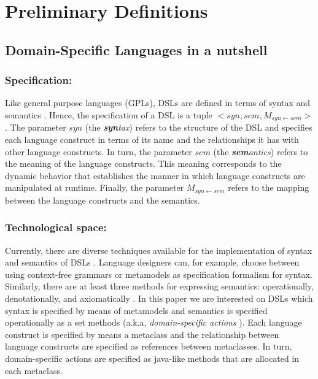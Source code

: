 \section{Preliminary Definitions}
\label{sec:background}

\subsection{Domain-Specific Languages in a nutshell}



\subsubsection{Specification:} Like general purpose languages (GPLs), DSLs are defined in terms of syntax and semantics \cite{Harel:2004b}. Hence, the specification of a DSL is a tuple $<syn,sem,M_{syn\leftarrow sem}>$ \cite{Combemale:2013}. The parameter $syn$ (the \textit{\textbf{syn}tax}) refers to the structure of the DSL and specifies each language construct in terms of its name and the relationships it has with other language constructs. In turn, the parameter $sem$ (the \textit{\textbf{sem}antics}) refers to the meaning of the language constructs. This meaning corresponds to the dynamic behavior that establishes the manner in which language constructs are manipulated at runtime. Finally, the parameter $M_{syn\leftarrow sem}$ refers to the mapping between the language constructs and the semantics. 


\vspace{-2mm}
\subsubsection{Technological space:} Currently, there are diverse techniques available for the implementation of syntax and semantics of DSLs \cite{Mernik:2005b}. Language designers can, for example, choose between using context-free grammars or metamodels as specification formalism for syntax. Similarly, there are at least three methods for expressing semantics: operationally, denotationally, and axiomatically \cite{Mosses:2001}. In this paper we are interested on DSLs which syntax is specified by means of metamodels and semantics is specified operationally as a set methods (a.k.a, \textit{domain-specific actions} \cite{Combemale:2013}). Each language construct is specified by means a metaclass and the relationship between language constructs are specified as references between metaclasses. In turn, domain-specific actions are specified as java-like methods that are allocated in each metaclass.

